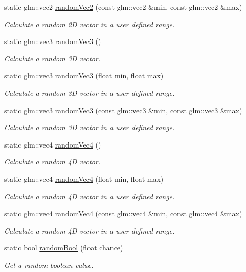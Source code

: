 \begin{DoxyCompactItemize}
static glm\+::vec2 \mbox{\hyperlink{classr3_1_1_random_a8c7e00a7b7e0fa8ce5c506e235bd6ed0}{random\+Vec2}} (const glm\+::vec2 \&min, const glm\+::vec2 \&max)
\begin{DoxyCompactList}\small\item\em Calculate a random 2D vector in a user defined range. \end{DoxyCompactList}\item 
static glm\+::vec3 \mbox{\hyperlink{classr3_1_1_random_a1819bc51a8924a8cbc4f8b2fc99d9a95}{random\+Vec3}} ()
\begin{DoxyCompactList}\small\item\em Calculate a random 3D vector. \end{DoxyCompactList}\item 
static glm\+::vec3 \mbox{\hyperlink{classr3_1_1_random_a85e5f280dcc4c84eea61bebb60b47d4a}{random\+Vec3}} (float min, float max)
\begin{DoxyCompactList}\small\item\em Calculate a random 3D vector in a user defined range. \end{DoxyCompactList}\item 
static glm\+::vec3 \mbox{\hyperlink{classr3_1_1_random_a1011998debe4842957f855c11ed1e1c2}{random\+Vec3}} (const glm\+::vec3 \&min, const glm\+::vec3 \&max)
\begin{DoxyCompactList}\small\item\em Calculate a random 3D vector in a user defined range. \end{DoxyCompactList}\item 
static glm\+::vec4 \mbox{\hyperlink{classr3_1_1_random_a567db457c9f995ca1062677d905f61d0}{random\+Vec4}} ()
\begin{DoxyCompactList}\small\item\em Calculate a random 4D vector. \end{DoxyCompactList}\item 
static glm\+::vec4 \mbox{\hyperlink{classr3_1_1_random_aec123971a394e6b064d00e7abb61d2a1}{random\+Vec4}} (float min, float max)
\begin{DoxyCompactList}\small\item\em Calculate a random 4D vector in a user defined range. \end{DoxyCompactList}\item 
static glm\+::vec4 \mbox{\hyperlink{classr3_1_1_random_a69cce589274029051cc7568dd8fde54d}{random\+Vec4}} (const glm\+::vec4 \&min, const glm\+::vec4 \&max)
\begin{DoxyCompactList}\small\item\em Calculate a random 4D vector in a user defined range. \end{DoxyCompactList}\item 
static bool \mbox{\hyperlink{classr3_1_1_random_a7b9dd03194e79fac4374e16c0b2ad03f}{random\+Bool}} (float chance)
\begin{DoxyCompactList}\small\item\em Get a random boolean value. \end{DoxyCompactList}\end{DoxyCompactItemize}


